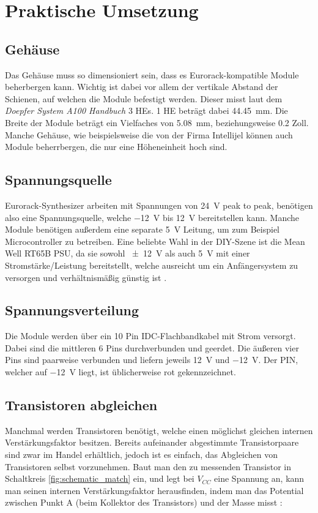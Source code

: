 \chapter{Praktische Umsetzung}

\section{Gehäuse}
\label{sec:orge6f5aa8}
Das Gehäuse muss so dimensioniert sein, dass es Eurorack-kompatible Module beherbergen kann. Wichtig ist dabei vor allem der vertikale Abstand der Schienen, auf welchen die Module befestigt werden. Dieser misst laut dem \emph{Doepfer System A100 Handbuch} \cite{doepfer:A-100} 3 \acp{HE}. 1 \ac{HE} beträgt dabei \SI{44.45}{\milli\meter}. Die Breite der Module beträgt ein Vielfaches von \SI{5.08}{\milli\meter}, beziehungsweise 0.2 Zoll. Manche Gehäuse, wie beispielsweise die von der Firma Intellijel können auch Module beherrbergen, die nur eine Höheneinheit hoch sind.

\section{Spannungsquelle}
\label{sec:org502799b}
Eurorack-Synthesizer arbeiten mit Spannungen von \SI{24}{\volt} peak to peak, benötigen also eine Spannungsquelle, welche \SI{-12}{\volt} bis \SI{+12}{\volt} bereitstellen kann. Manche Module benötigen außerdem eine separate \SI{5}{\volt} Leitung, um zum Beispiel Microcontroller zu betreiben. Eine beliebte Wahl in der DIY-Szene ist die Mean Well RT65B PSU, da sie sowohl \SI{\pm 12}{\volt} als auch \SI{5}{\volt} mit einer Stromstärke/Leistung bereitstellt, welche ausreicht um ein Anfängersystem zu versorgen und verhältnismäßig günstig ist \cite{modularsynthlab:rt65b}.

\section{Spannungsverteilung}
\label{sec:org9ef922c}
Die Module werden über ein 10 Pin IDC-Flachbandkabel mit Strom versorgt. Dabei sind die mittleren 6 Pins durchverbunden und geerdet. Die äußeren vier Pins sind paarweise verbunden und liefern jeweils \SI{+12}{\volt} und \SI{-12}{\volt}. Der PIN, welcher auf \SI{-12}{\volt} liegt, ist üblicherweise rot gekennzeichnet.

\section{Transistoren abgleichen}
\label{sec:org14681f5}
Manchmal werden Transistoren benötigt, welche einen möglichst gleichen internen Verstärkungsfaktor besitzen. Bereits aufeinander abgestimmte Transistorpaare sind zwar im Handel erhältlich, jedoch ist es einfach, das Abgleichen von Transistoren selbst vorzunehmen. Baut man den zu messenden Transistor in Schaltkreis \ref{fig:schematic_match} ein, und legt bei \(V_{CC}\) eine Spannung an, kann man seinen internen Verstärkungsfaktor herausfinden, indem man das Potential zwischen Punkt A (beim Kollektor des Transistors) und der Masse misst \cite{match_transistors}:

